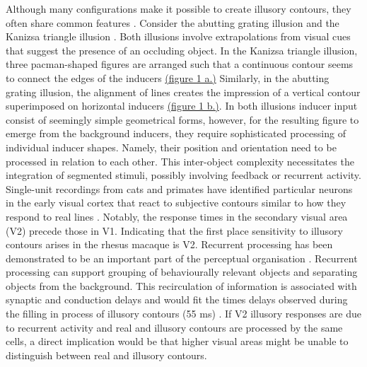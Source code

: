 \documentclass[12pt]{article}
\begin{document}
\bigbreak
Although many configurations make it possible to create illusory contours, they often share common features \autocite{palmerLateInfluencesPerceptual2000}. Consider the abutting grating illusion \autocite{sorianoAbuttingGratingIllusion1996} and the Kanizsa triangle illusion \autocite{kanizsaSubjectiveContours1976}. Both illusions involve extrapolations from visual cues that suggest the presence of an occluding object. In the Kanizsa triangle illusion, three pacman-shaped figures are arranged such that a continuous contour seems to connect the edges of the inducers \hyperref[fig:figure_1]{(figure 1 a.)} Similarly, in the abutting grating illusion, the alignment of lines creates the impression of a vertical contour superimposed on horizontal inducers \hyperref[fig:figure_1]{(figure 1 b.)}.
In both illusions inducer input consist of seemingly simple geometrical forms, however, for the resulting figure to emerge from the background inducers, they require sophisticated processing of individual inducer shapes. Namely, their position and orientation need to be processed in relation to each other. This inter-object complexity necessitates the integration of segmented stimuli, possibly involving feedback or recurrent activity. Single-unit recordings from cats and primates have identified particular neurons in the early visual cortex that react to subjective contours similar to how they respond to real lines \autocite{leeDynamicsSubjectiveContour2001,vonderheydtMechanismsContourPerception1989}. Notably, the response times in the secondary visual area (V2) precede those in V1. Indicating that the first place sensitivity to illusory contours arises in the rhesus macaque is V2. Recurrent processing has been demonstrated to be an important part of the perceptual organisation \autocite{roelfsemaCORTICALALGORITHMSPERCEPTUAL2006}. Recurrent processing can support grouping of behaviourally relevant objects and separating objects from the background. This recirculation of information is associated with synaptic and conduction delays and would fit the times delays observed during the filling in process of illusory contours (55 ms) \autocite{leeDynamicsSubjectiveContour2001,pakTopDownFeedbackControls2020}. If V2 illusory responses are due to recurrent activity and real and illusory contours are processed by the same cells, a direct implication would be that higher visual areas might be unable to distinguish between real and illusory contours.
\end{document}

